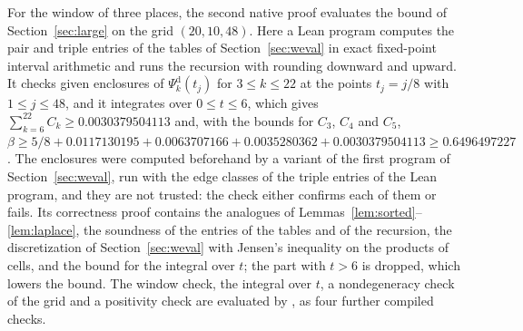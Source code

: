 \documentclass[11pt]{amsart}
\theoremstyle{definition}
\theoremstyle{remark}
\numberwithin{equation}{section}
\newcommand{\lean}[1]{\texttt{\detokenize{#1}}}
\newcommand{\CThree}{0.0117130195}
\newcommand{\CFour}{0.0063707166}
\newcommand{\CFive}{0.0035280362}
\newcommand{\KmaxW}{22}
\newcommand{\LeanWbound}{0.6496497227}%
\newcommand{\LeanWThree}{0.0030379504113}%
\newcommand{\Kmax}{\KmaxW}
\begin{document}
For the window of three places, the second native proof evaluates the bound of Section~\ref{sec:large} on the grid $(20,10,48)$. Here a Lean program computes the pair and triple entries of the tables of Section~\ref{sec:weval} in exact fixed-point interval arithmetic and runs the recursion with rounding downward and upward. It checks given enclosures of $\Psi_k^{\mathrm d}(t_j)$ for $3\le k\le\Kmax$ at the points $t_j=j/8$ with $1\le j\le48$, and it integrates over $0\le t\le6$, which gives $\sum_{k=6}^{\Kmax}C_k\ge\LeanWThree$ and, with the bounds for $C_3$, $C_4$ and $C_5$, $\beta\ge5/8+\CThree+\CFour+\CFive+\LeanWThree\ge\LeanWbound$. The enclosures were computed beforehand by a variant of the first program of Section~\ref{sec:weval}, run with the edge classes of the triple entries of the Lean program, and they are not trusted: the check either confirms each of them or fails. Its correctness proof contains the analogues of Lemmas~\ref{lem:sorted}--\ref{lem:laplace}, the soundness of the entries of the tables and of the recursion, the discretization of Section~\ref{sec:weval} with Jensen's inequality on the products of cells, and the bound for the integral over $t$; the part with $t>6$ is dropped, which lowers the bound. The window check, the integral over $t$, a nondegeneracy check of the grid and a positivity check are evaluated by \lean{native_decide}, as four further compiled checks.
\end{document}
